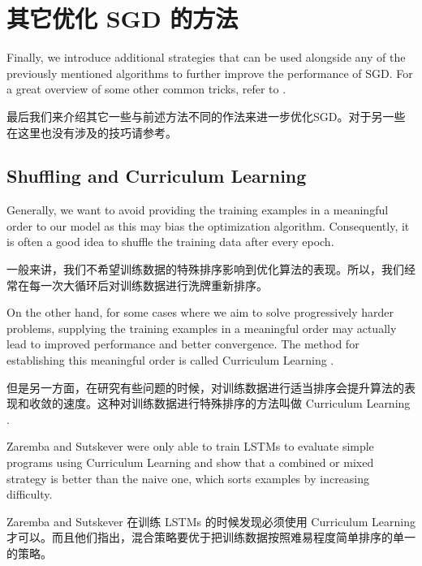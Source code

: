 \documentclass{article}
\begin{document}
\section{其它优化 SGD 的方法} \label{sec:strategies}

Finally, we introduce additional strategies that can be used alongside any of the previously mentioned algorithms to further improve the performance of SGD. For a great overview of some other common tricks, refer to \cite{LeCun1998}.

最后我们来介绍其它一些与前述方法不同的作法来进一步优化SGD。对于另一些在这里也没有涉及的技巧请参考\cite{LeCun1998}。

\subsection{Shuffling and Curriculum Learning} \label{sec:shuffling}

Generally, we want to avoid providing the training examples in a meaningful order to our model as this may bias the optimization algorithm. Consequently, it is often a good idea to shuffle the training data after every epoch. 

一般来讲，我们不希望训练数据的特殊排序影响到优化算法的表现。所以，我们经常在每一次大循环后对训练数据进行洗牌重新排序。

On the other hand, for some cases where we aim to solve progressively harder problems, supplying the training examples in a meaningful order may actually lead to improved performance and better convergence. The method for establishing this meaningful order is called Curriculum Learning \cite{Bengio2009a}. 

但是另一方面，在研究有些问题的时候，对训练数据进行适当排序会提升算法的表现和收敛的速度。这种对训练数据进行特殊排序的方法叫做 Curriculum Learning \cite{Bengio2009a}.

Zaremba and Sutskever \cite{Zaremba2014a} were only able to train LSTMs to evaluate simple programs using Curriculum Learning and show that a combined or mixed strategy is better than the naive one, which sorts examples by increasing difficulty.

Zaremba and Sutskever \cite{Zaremba2014a} 在训练 LSTMs 的时候发现必须使用 Curriculum Learning 才可以。而且他们指出，混合策略要优于把训练数据按照难易程度简单排序的单一的策略。
\end{document}
